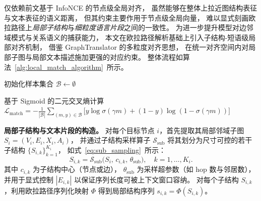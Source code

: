 仅依赖前文基于 InfoNCE 的节点级全局对齐，
虽然能够在整体上拉近图结构表征与文本表征的语义距离，
但其约束主要作用于节点级全局向量，
难以显式刻画欧拉路径上\emph{局部子结构}与\emph{细粒度语言片段}之间的一致性。
为进一步提升模型对边邻域模式与关系语义的捕获能力，
本文在欧拉路径解析基础上引入子结构-短语级局部对齐机制，
借鉴 GraphTranslator \cite{Zhang2024GraphTranslatorAG}的多粒度对齐思想，
在统一对齐空间内对局部子图与局部文本描述施加更强的对应约束。
整体流程如算法~\ref{alg:local_match_algorithm}\ 所示。

\begin{algorithm}[t]
\caption{子结构-短语级 token 匹配损失 $\mathcal{L}_{\mathrm{match}}$ 的计算流程}
\label{alg:local_match_algorithm}

初始化样本集合 $\mathcal{B}\gets\emptyset$\;


基于 Sigmoid 的二元交叉熵计算
$\mathcal{L}_{\mathrm{match}}= -\frac{1}{|\mathcal{B}|}\sum_{(m,y)\in\mathcal{B}}\bigl[y\log\sigma(\gamma m)+(1-y)\log(1-\sigma(\gamma m))\bigr]$\;
\;
\end{algorithm}



\textbf{局部子结构与文本片段的构造。}
对每个目标节点 $i$，首先提取其局部邻域子图 $S_i=(V_i,E_i,X_i,A_i)$，
并通过子结构采样算子 $\mathcal{S}_{\mathrm{sub}}$
将其划分为尺寸可控的若干子结构 $\{S_{i,k}\}_{k=1}^{K_i}$，
如式~\ref{eq:sub_sampling}\ 所示：
\begin{equation}
  S_{i,k}
  = \mathcal{S}_{\mathrm{sub}}\bigl(S_i,\, c_{i,k},\, \theta_{\mathrm{sub}}\bigr),
  \quad k=1,\dots,K_i.
  \label{eq:sub_sampling}
\end{equation}
其中 $c_{i,k}$ 为子结构中心（节点或边），
$\theta_{\mathrm{sub}}$ 为采样超参数（如 hop 数与邻居数），并用于显式控制 $|E_{i,k}|$ 以保证序列长度可被上下文窗口容纳。
对每个子结构 $S_{i,k}$，利用欧拉路径序列化映射 $\Phi$ 得到局部结构序列
$s_{i,k}=\Phi(S_{i,k})$。

